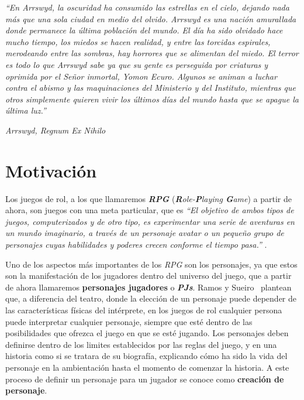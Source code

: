 

\vspace*{\fill}
\epigraph{\textit{“En Arrswyd, la oscuridad ha consumido las estrellas en el cielo, 
dejando nada más que una sola ciudad en medio del olvido. Arrswyd es una nación amurallada 
donde permanece la última población del mundo. El día ha sido olvidado hace mucho tiempo, 
los miedos se hacen realidad, y entre las torcidas espirales, merodeando entre las sombras, 
hay horrores que se alimentan del miedo. El terror es todo lo que Arrswyd sabe ya que su gente 
es perseguida por criaturas y oprimida por el Señor inmortal, Yomon Ecuro. Algunos se animan a 
luchar contra el abismo y las maquinaciones del Ministerio y del Instituto, mientras que otros 
simplemente quieren vivir los últimos días del mundo hasta que se apague la última luz.”}}{\textit{Arrswyd, Regnum Ex Nihilo}}
\vspace*{\fill}

\newpage

\section{Motivación}
Los juegos de rol, a los que llamaremos \textbf{\textit{RPG}} (\textit{\textbf{R}ole-\textbf{P}laying \textbf{G}ame}) a 
partir de ahora, son juegos con una meta particular, que es \textit{“El objetivo de ambos tipos de juegos, computerizados y 
de otro tipo, es experimentar una serie de aventuras en un mundo imaginario, a través de un personaje avatar o un pequeño grupo de 
personajes cuyas habilidades y poderes crecen conforme el tiempo pasa.”} \autocite*{Adams2010}. \medskip

Uno de los aspectos más importantes de los \textit{RPG} son los personajes, ya que estos son la manifestación de los jugadores 
dentro del universo del juego, que a partir de ahora llamaremos \textbf{personajes jugadores} o \textbf{\textit{PJs}}. 
Ramos y Sueiro~\autocite*{Ramos-Villagrasa2010} plantean que, a diferencia del teatro, donde la elección de un personaje puede depender de las características 
físicas del intérprete, en los juegos de rol cualquier persona puede interpretar cualquier personaje, siempre que esté dentro de las 
posibilidades que ofrezca el juego en que se esté jugando. Los personajes deben definirse dentro de los limites establecidos por 
las reglas del juego, y en una historia como si se tratara de su biografía, explicando cómo ha sido la vida del personaje en 
la ambientación hasta el momento de comenzar la historia. A este proceso de definir un personaje 
para un jugador se conoce como \textbf{creación de personaje}. \medskip

